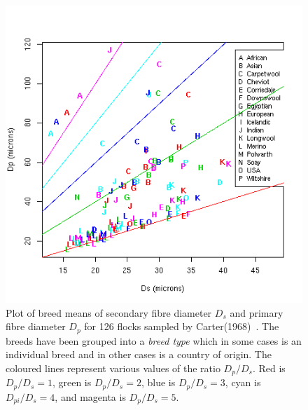 %

\begin{figure}[!h]
  \centering
   \includegraphics[width=1.0\textwidth]{dsdpalltype.png}
  \caption{Plot of breed means of secondary fibre diameter $D_{s}$ and primary fibre diameter $D_{p}$ for 126 flocks sampled by Carter(1968)~\cite{cart:68}. The breeds have been grouped into a {\em breed type} which in some cases is an individual breed and in other cases is a country of origin. The coloured lines represent various values of the ratio $D_{p}/D_{s}$. Red is $D_{p}/D_{s}=1$, green is $D_{p}/D_{s}=2$, blue is $D_{p}/D_{s}=3$, cyan is $D_{pi}/D_{s}=4$, and magenta is $D_{p}/D_{s}=5$.}
  \label{fig:dsdptype}
\end{figure}

%

